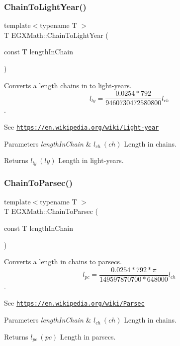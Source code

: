 \subsubsection{\texorpdfstring{Chain\+To\+Light\+Year()}{ChainToLightYear()}}
{\footnotesize\ttfamily template$<$typename T $>$ \\
T E\+G\+X\+Math\+::\+Chain\+To\+Light\+Year (\begin{DoxyParamCaption}\item[{const T}]{length\+In\+Chain }\end{DoxyParamCaption})}



Converts a length chains in to light-\/years. \[ l_{ly}=\frac{0.0254 * 792}{9460730472580800} l_{ch} \]. 

See \href{https://en.wikipedia.org/wiki/Light-year}{\tt https\+://en.\+wikipedia.\+org/wiki/\+Light-\/year} 
\begin{DoxyParams}{Parameters}
{\em length\+In\+Chain} & $ l_{ch}\ (ch)$ Length in chains. \\
\hline
\end{DoxyParams}
\begin{DoxyReturn}{Returns}
$ l_{ly}\ (ly)$ Length in light-\/years. 
\end{DoxyReturn}
\mbox{\label{group___e_g_x_math-_conversions-_length_conversions-_surveyors-_chain-_astronomical_gad5475701b576e1f8609e04610024dda2}} 
\subsubsection{\texorpdfstring{Chain\+To\+Parsec()}{ChainToParsec()}}
{\footnotesize\ttfamily template$<$typename T $>$ \\
T E\+G\+X\+Math\+::\+Chain\+To\+Parsec (\begin{DoxyParamCaption}\item[{const T}]{length\+In\+Chain }\end{DoxyParamCaption})}



Converts a length in chains to parsecs. \[ l_{pc}=\frac{0.0254 * 792 * \pi}{149597870700 * 648000} l_{ch} \]. 

See \href{https://en.wikipedia.org/wiki/Parsec}{\tt https\+://en.\+wikipedia.\+org/wiki/\+Parsec} 
\begin{DoxyParams}{Parameters}
{\em length\+In\+Chain} & $ l_{ch}\ (ch)$ Length in chains. \\
\hline
\end{DoxyParams}
\begin{DoxyReturn}{Returns}
$ l_{pc}\ (pc)$ Length in parsecs. 
\end{DoxyReturn}
